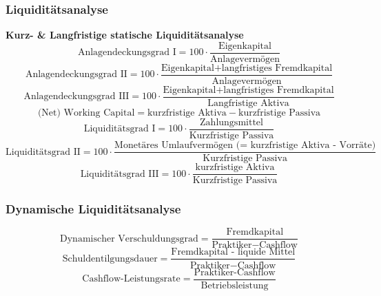 \documentclass[11pt]{scrartcl}
\begin{document}
\subsubsection[]{Liquiditätsanalyse}
\textbf{Kurz- \& Langfristige statische Liquiditätsanalyse}
\begin{equation}
    \text{Anlagendeckungsgrad I} = 100\cdot\frac{\text{Eigenkapital}}{\text{Anlagevermögen}}
\end{equation}
\begin{equation}
    \text{Anlagendeckungsgrad II} = 100\cdot\frac{\text{Eigenkapital+langfristiges Fremdkapital}}{\text{Anlagevermögen}}
\end{equation}
\begin{equation}
    \text{Anlagendeckungsgrad III} = 100\cdot\frac{\text{Eigenkapital+langfristiges Fremdkapital}}{\text{Langfristige Aktiva}}
\end{equation}
\begin{equation}
    \text{(Net) Working Capital} = \text{kurzfristige Aktiva} - \text{kurzfristige Passiva}
\end{equation}
\begin{equation}
    \text{Liquiditätsgrad I} = 100\cdot\frac{\text{Zahlungsmittel}}{\text{Kurzfristige Passiva}}
\end{equation}
\begin{equation}
    \text{Liquiditätsgrad II} = 100\cdot\frac{\text{Monetäres Umlaufvermögen (= kurzfristige Aktiva - Vorräte)}}{\text{Kurzfristige Passiva}}
\end{equation}
\begin{equation}
    \text{Liquiditätsgrad III} = 100\cdot\frac{\text{kurzfristige Aktiva}}{\text{Kurzfristige Passiva}}
\end{equation}
\subsubsection[]{Dynamische Liquiditätsanalyse}
\begin{equation}
    \text{Dynamischer Verschuldungsgrad} = \frac{\text{Fremdkapital}}{\text{Praktiker}-\text{Cashflow}}
\end{equation}
\begin{equation}
    \text{Schuldentilgungsdauer} = \frac{\text{Fremdkapital - liquide Mittel}}{\text{Praktiker}-\text{Cashflow}}
\end{equation}
\begin{equation}
    \text{Cashflow-Leistungsrate} = \frac{\text{Praktiker-Cashflow}}{\text{Betriebsleistung}}
\end{equation}
\end{document}
